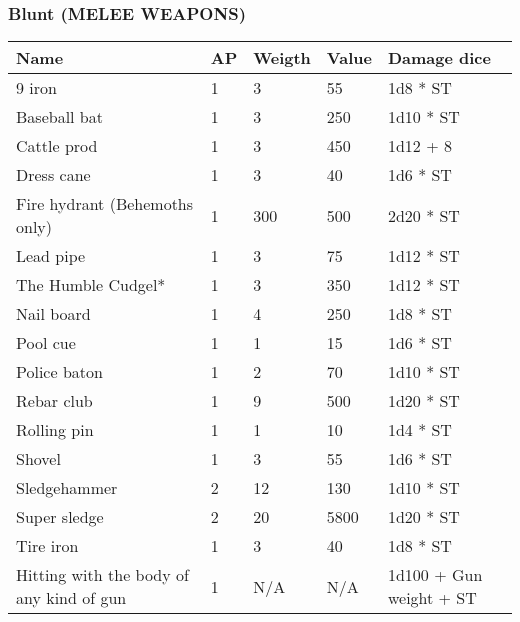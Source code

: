 
\subsubsection{Blunt (MELEE WEAPONS)}
\begin{longtable}{|p{6cm}|p{1.5cm}|p{3cm}|p{3cm}|p{4cm}|}
\hline
\bfseries Name & \bfseries AP & \bfseries Weigth & \bfseries Value & \bfseries Damage dice \\
\hline
\endhead
9 iron & 1 & 3 & 55 & 1d8 * ST \\
Baseball bat & 1 & 3 & 250 & 1d10 * ST \\
Cattle prod & 1 & 3 & 450 & 1d12 + 8 \\
Dress cane & 1 & 3 & 40 & 1d6 * ST \\
Fire hydrant (Behemoths only) & 1 & 300 & 500 & 2d20 * ST \\
Lead pipe & 1 & 3 & 75 & 1d12 * ST \\
The Humble Cudgel* & 1 & 3 & 350 & 1d12 * ST \\
Nail board & 1 & 4 & 250 & 1d8 * ST \\
Pool cue & 1 & 1 & 15 & 1d6 * ST \\
Police baton & 1 & 2 & 70 & 1d10 * ST \\
Rebar club & 1 & 9 & 500 & 1d20 * ST \\
Rolling pin & 1 & 1 & 10 & 1d4 * ST \\
Shovel & 1 & 3 & 55 & 1d6 * ST \\
Sledgehammer & 2 & 12 & 130 & 1d10 * ST \\
Super sledge & 2 & 20 & 5800 & 1d20 * ST \\
Tire iron & 1 & 3 & 40 & 1d8 * ST \\
Hitting with the body of any kind of gun & 1 & N/A & N/A & 1d100 + Gun weight + ST \\
\hline
\end{longtable}
